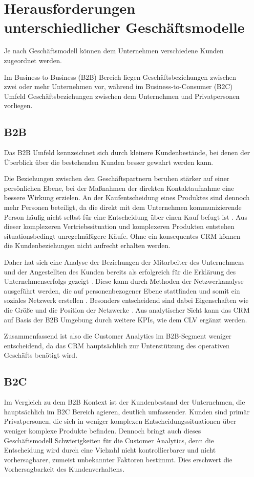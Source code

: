 \section{Herausforderungen unterschiedlicher Geschäftsmodelle}
\label{sec:herausforderungen}

Je nach Geschäftsmodell können dem Unternehmen verschiedene Kunden zugeordnet werden.

Im Business-to-Business (B2B) Bereich liegen Geschäftsbeziehungen zwischen zwei oder mehr Unternehmen vor, während im Business-to-Consumer (B2C) Umfeld Geschäftsbeziehungen zwischen dem Unternehmen und Privatpersonen vorliegen. \cite{aichele2016}

\subsection{B2B}
Das B2B Umfeld kennzeichnet sich durch kleinere Kundenbestände, bei denen der Überblick über die bestehenden Kunden besser gewahrt werden kann.

Die Beziehungen zwischen den Geschäftspartnern beruhen stärker auf einer persönlichen Ebene, bei der Maßnahmen der direkten Kontaktaufnahme eine bessere Wirkung erzielen. An der Kaufentscheidung eines Produktes sind dennoch mehr Personen beteiligt, da die direkt mit dem Unternehmen kommunizierende Person häufig nicht selbst für eine Entscheidung über einen Kauf befugt ist \cite{aichele2016}. Aus dieser komplexeren Vertriebssituation und komplexeren Produkten entstehen situationsbedingt unregelmäßigere Käufe. Ohne ein konsequentes CRM können die Kundenbeziehungen nicht aufrecht erhalten werden.

Daher hat sich eine Analyse der Beziehungen der Mitarbeiter des Unternehmens und der Angestellten des Kunden bereits als erfolgreich für die Erklärung des Unternehmenserfolgs gezeigt \cite{gummesson2011}. Diese kann durch Methoden der Netzwerkanalyse ausgeführt werden, die auf personenbezogener Ebene stattfinden und somit ein soziales Netzwerk erstellen \cite{habryn2012}. Besonders entscheidend sind dabei Eigenschaften wie die Größe und die Position der Netzwerke \cite{hutt2006}. Aus analytischer Sicht kann das CRM auf Basis der B2B Umgebung durch weitere KPIs, wie dem CLV ergänzt werden.

Zusammenfassend ist also die Customer Analytics im B2B-Segment weniger entscheidend, da das CRM hauptsächlich zur Unterstützung des operativen Geschäfts benötigt wird.

\subsection{B2C}
Im Vergleich zu dem B2B Kontext ist der Kundenbestand der Unternehmen, die hauptsächlich im B2C Bereich agieren, deutlich umfassender. Kunden sind primär Privatpersonen, die sich in weniger komplexen Entscheidungssituationen über weniger komplexe Produkte befinden. Dennoch bringt auch dieses Geschäftsmodell Schwierigkeiten für die Customer Analytics, denn die Entscheidung wird durch eine Vielzahl nicht kontrollierbarer und nicht vorhersagbarer, zumeist unbekannter Faktoren bestimmt. Dies erschwert die Vorhersagbarkeit des Kundenverhaltens. 

